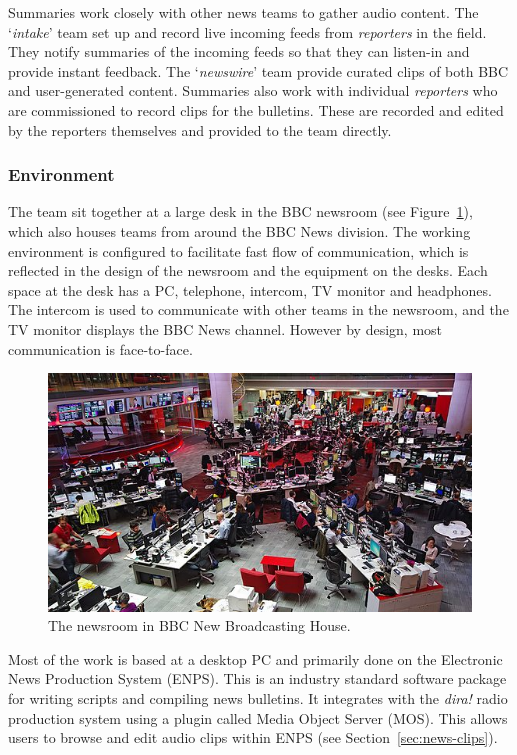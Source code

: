 Summaries work closely with other news teams to gather audio content. The `\textit{intake}' team set up and record live
incoming feeds from \textit{reporters} in the field. They notify summaries of the incoming feeds so that they can
listen-in and provide instant feedback. The `\textit{newswire}' team provide curated clips of both BBC and
user-generated content. Summaries also work with individual \textit{reporters} who are commissioned to record clips for
the bulletins. These are recorded and edited by the reporters themselves and provided to the team directly.

\subsubsection{Environment}
The team sit together at a large desk in the BBC newsroom (see Figure~\ref{fig:newsroom}), which also houses teams from
around the BBC News division.  The working environment is configured to facilitate fast flow of communication, which is
reflected in the design of the newsroom and the equipment on the desks.  Each space at the desk has a PC, telephone,
intercom, TV monitor and headphones. The intercom is used to communicate with other teams in the newsroom, and the TV
monitor displays the BBC News channel. However by design, most communication is face-to-face.

\begin{figure}[ht]
  \centering
  \includegraphics[width=\columnwidth]{figs/newsroom.jpg}
  \caption{The newsroom in BBC New Broadcasting House.}
  \label{fig:newsroom}
\end{figure}

Most of the work is based at a desktop PC and primarily done on the Electronic News Production System (ENPS). This is
an industry standard software package for writing scripts and compiling news bulletins. It integrates with the
\textit{dira!} radio production system using a plugin called Media Object Server (MOS). This allows users to browse and
edit audio clips within ENPS (see Section~\ref{sec:news-clips}).

